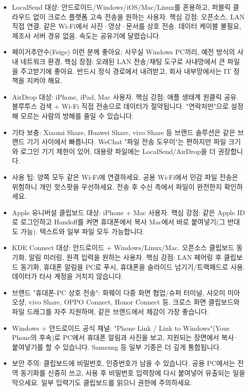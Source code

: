 
\begin{itemize}
  \item LocalSend 대상: 안드로이드/Windows/iOS/Mac/Linux를 혼용하고, 퍼블릭 클라우드 없이 크로스 플랫폼 고속 전송을 원하는 사용자. 핵심 강점: 오픈소스, LAN 직접 연결. 같은 Wi-Fi에서 사진·영상·문서를 상호 전송. 데이터 케이블 불필요, 제조사 서버 경유 없음. 속도는 공유기에 달렸습니다.
  \item 페이거추안수(Feige) 이런 분께 좋아요: 사무실 Windows PC끼리, 예전 방식의 사내 네트워크 환경. 핵심 장점: 오래된 LAN 전송/채팅 도구로 사내망에서 큰 파일을 주고받기에 좋아요. 반드시 정식 경로에서 내려받고, 회사 내부망에서는 IT 정책을 지켜야 해요.
  \item AirDrop 대상: iPhone, iPad, Mac 사용자. 핵심 강점: 애플 생태계 원클릭 공유. 블루투스 검색 + Wi-Fi 직접 전송으로 데이터가 절약됩니다. "연락처만"으로 설정해 모르는 사람의 방해를 줄일 수 있습니다.
  \item 기타 보충: Xiaomi Share, Huawei Share, vivo Share 등 브랜드 솔루션은 같은 브랜드 기기 사이에서 빠릅니다. WeChat "파일 전송 도우미"는 편하지만 파일 크기와 로그인 기기 제한이 있어, 대용량 파일에는 LocalSend/AirDrop을 더 권장합니다.
  \item 사용 팁: 양쪽 모두 같은 Wi-Fi에 연결하세요. 공용 Wi-Fi에서 민감 파일 전송은 위험하니 개인 핫스팟을 우선하세요. 전송 후 수신 측에서 파일이 완전한지 확인하세요.
\end{itemize}


\begin{itemize}
  \item Apple 유니버설 클립보드 대상: iPhone + Mac 사용자. 핵심 강점: 같은 Apple ID로 로그인하고 Handoff를 켜면 휴대폰에서 복사 Mac에서 바로 붙여넣기(그 반대도 가능). 텍스트와 일부 파일 모두 가능합니다.
  \item KDE Connect 대상: 안드로이드 + Windows/Linux/Mac. 오픈소스 클립보드 동기화, 알림 미러링, 원격 입력을 원하는 사용자. 핵심 강점: LAN 페어링 후 클립보드 동기화, 휴대폰 알림을 PC로 푸시, 휴대폰을 슬라이드 넘기기/트랙패드로 사용. 데이터가 타사 계정을 거치지 않습니다.
  \item 브랜드 "휴대폰-PC 상호 전송": 화웨이 다중 화면 협업/슈퍼 터미널, 샤오미 미아오샹, vivo Share, OPPO Connect, Honor Connect 등. 크로스 화면 클립보드와 파일 드래그를 자주 지원하며, 같은 브랜드에서 체감이 가장 좋습니다.
  \item Windows + 안드로이드 공식 채널: "Phone Link / Link to Windows"(Your Phone의 후속)로 PC에서 휴대폰 알림과 사진을 보고, 지원되는 장면에서 복사·붙여넣기를 할 수 있습니다. Samsung 등 일부 기종은 더 깊게 통합됩니다.
  \item 보안 주의: 클립보드에 비밀번호, 인증번호가 남을 수 있습니다. 공용 PC에서는 전역 동기화를 신중히 쓰고, 사용 후 비밀번호 입력창에 다시 붙여넣어 유출되는 일을 막으세요. 일부 입력기도 클립보드를 읽으니 권한에 주의하세요.
\end{itemize}

